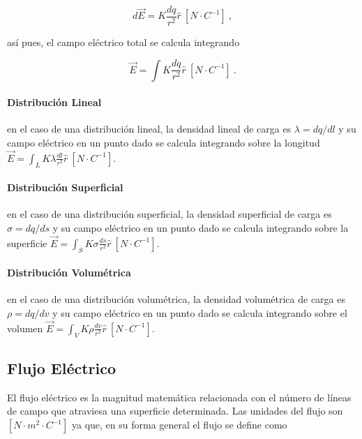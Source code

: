 \documentclass{tufte-handout}
\begin{document}
\begin{equation}
d\vec{E} = K\frac{dq}{r^2}\hat{r}~[N\cdot C^{-1}]~,
\end{equation}

así pues, el campo eléctrico total se calcula integrando

\begin{equation}
\vec{E} = \int K\frac{dq}{r^2}\hat{r}~[N\cdot C^{-1}]~.
\end{equation}

\paragraph{Distribución Lineal} en el caso de una distribución lineal, la densidad lineal de carga es $\lambda = dq / dl$ y su campo eléctrico en un punto dado se calcula integrando sobre la longitud $\vec{E} = \int_L K\lambda\frac{dl}{r^2}\hat{r}~[N\cdot C^{-1}]$.

\paragraph{Distribución Superficial} en el caso de una distribución superficial, la densidad superficial de carga es $\sigma = dq / ds$ y su campo eléctrico en un punto dado se calcula integrando sobre la superficie $\vec{E} = \int_S K\sigma\frac{ds}{r^2}\hat{r}~[N\cdot C^{-1}]$.

\paragraph{Distribución Volumétrica} en el caso de una distribución volumétrica, la densidad volumétrica de carga es $\rho = dq / dv$ y su campo eléctrico en un punto dado se calcula integrando sobre el volumen $\vec{E} = \int_V K\rho\frac{dv}{r^2}\hat{r}~[N\cdot C^{-1}]$.

\subsection{Flujo Eléctrico}

El flujo eléctrico es la magnitud matemática relacionada con el número de líneas de campo que atraviesa una superficie determinada. Las unidades del flujo son $[N\cdot m^2 \cdot C^{-1}]$ ya que, en su forma general el flujo se define como

\end{document}
